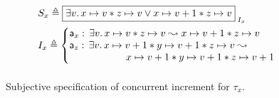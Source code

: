 \begin{figure}
\noindent\makebox[\linewidth]{\rule{\linewidth}{1pt}}
%
\[
\begin{array}{l }
	S_{x} \eqdef 
	\shared{
		\exsts{v}   \cell{x}{v}  * \cell{z}{v}  \lor \cell{x}{v+1}  * \cell{z}{v}
	}{I_x}\vspace*{5pt}\\
	

	
	I_x \eqdef \left\{
		\begin{array}{@{}l@{}}
			\token a_x:\, \exsts{v} \cell{x}{v} * \cell{z}{v}  \swap  \cell{x}{v+1} * \cell{z}{v}\\
			\token a_z:\, \exsts{v} \cell{x}{v+1} *  \cell{y}{v+1} * \cell{z}{v}\swap\null\\
			\hspace*{2cm} \cell{x}{v+1} * \cell{y}{v+1} * \cell{z}{v+1}\\
		\end{array}			
	
	\right.
	\vspace*{5pt}\\
	
\end{array} \vspace*{-5pt}
\]
%
\noindent\makebox[\linewidth]{\rule{\linewidth}{1pt}}
\caption{Subjective specification of concurrent increment for $\tau_x$.}
\label{fig:concurrentIncSubjectiveSpec}
\end{figure} 
%
%

